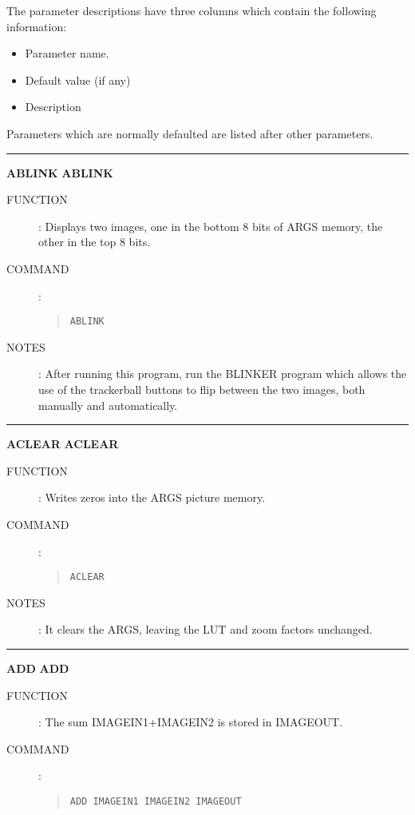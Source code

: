 The parameter descriptions have three columns which contain the following
information:
\begin{itemize}
\item Parameter name.
\item Default value (if any)
\item Description
\end{itemize}
Parameters which are normally defaulted are listed after other parameters.\\

\goodbreak
\rule{\textwidth}{0.3mm}
{\Large {\bf ABLINK} \hfill {\bf ABLINK}}
\begin{description}
\item [FUNCTION]:
Displays two images, one in the bottom 8 bits of ARGS memory, the other in the
top 8 bits.
\item [COMMAND]:
\begin{quote}
{\tt ABLINK}
\end{quote}
\item [NOTES]:
After running this program, run the BLINKER program which allows the use of the
trackerball buttons to flip between the two images, both manually and
automatically.
\end{description}

\goodbreak
\rule{\textwidth}{0.3mm}
{\Large {\bf ACLEAR} \hfill {\bf ACLEAR}}
\begin{description}
\item [FUNCTION]:
Writes zeros into the ARGS picture memory.
\item [COMMAND]:
\begin{quote}
{\tt ACLEAR}
\end{quote}
\item [NOTES]:
It clears the ARGS, leaving the LUT and zoom factors unchanged.
\end{description}

\goodbreak
\rule{\textwidth}{0.3mm}
{\Large {\bf ADD} \hfill {\bf ADD}}
\begin{description}
\item [FUNCTION]:
The sum IMAGEIN1+IMAGEIN2 is stored in IMAGEOUT.
\item [COMMAND]:
\begin{quote}
{\tt ADD  IMAGEIN1  IMAGEIN2  IMAGEOUT}
\end{quote}
\end{description}

